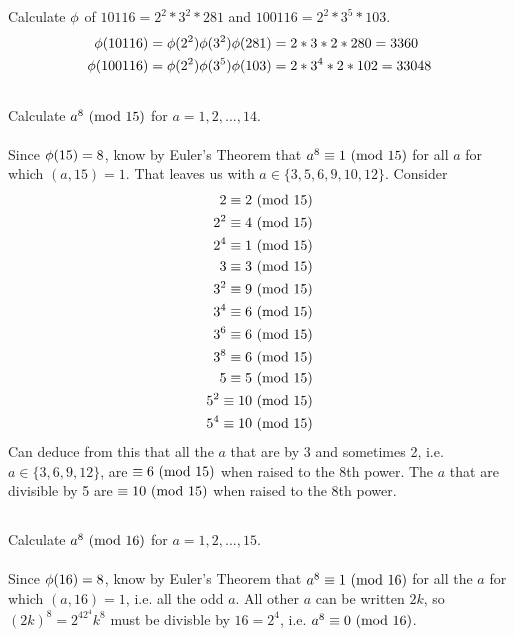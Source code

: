 \documentclass{article}
\begin{document}
\subsection{}
Calculate $\phi$ of $10116 = 2^2 * 3^2 * 281$ and $100116 = 2^2 * 3^5 * 103$.
\begin{align*}
    \phi(10116) &= \phi(2^2)\phi(3^2)\phi(281) = 2 * 3 * 2 * 280 = 3360\\
    \phi(100116) &= \phi(2^2)\phi(3^5)\phi(103) = 2 * 3^4 * 2 * 102 = 33048
\end{align*}

\subsection{}
Calculate $a^8 \ (\mathrm{mod}\ 15)$ for $a = 1, 2, ..., 14$.\\~\\
Since $\phi(15) = 8$, know by Euler's Theorem that $a^8 \equiv 1 \ (\mathrm{mod}\ 15)$
for all $a$ for which $(a, 15) = 1$.
That leaves us with $a \in \{3, 5, 6, 9, 10, 12\}$.
Consider
\begin{align*}
    2 \equiv 2 \ (\mathrm{mod}\ 15)\\
    2^2 \equiv 4 \ (\mathrm{mod}\ 15)\\
    2^4 \equiv 1 \ (\mathrm{mod}\ 15)\\
    3 \equiv 3 \ (\mathrm{mod}\ 15)\\
    3^2 \equiv 9 \ (\mathrm{mod}\ 15)\\
    3^4 \equiv 6 \ (\mathrm{mod}\ 15)\\
    3^6 \equiv 6 \ (\mathrm{mod}\ 15)\\
    3^8 \equiv 6 \ (\mathrm{mod}\ 15)\\
    5 \equiv 5 \ (\mathrm{mod}\ 15)\\
    5^2 \equiv 10 \ (\mathrm{mod}\ 15)\\
    5^4 \equiv 10 \ (\mathrm{mod}\ 15)
\end{align*}
Can deduce from this that all the $a$ that are by 3 and sometimes 2, i.e.
$a \in \{3, 6, 9, 12\}$, are $\equiv 6 \ (\mathrm{mod}\ 15)$ when raised to the 8th power.
The $a$ that are divisible by 5 are $\equiv 10 \ (\mathrm{mod}\ 15)$ when raised to the 8th power.


\subsection{}
Calculate $a^8 \ (\mathrm{mod}\ 16)$ for $a = 1, 2, ..., 15$.\\~\\
Since $\phi(16) = 8$, know by Euler's Theorem that $a^8 \equiv 1 \ (\mathrm{mod}\ 16)$
for all the $a$ for which $(a, 16) = 1$, i.e. all the odd $a$.
All other $a$ can be written $2k$, so $(2k)^8 = 2^42^4k^8$ must be divisble
by $16 = 2^4$, i.e. $a^8 \equiv 0 \ (\mathrm{mod}\ 16)$.
\end{document}

